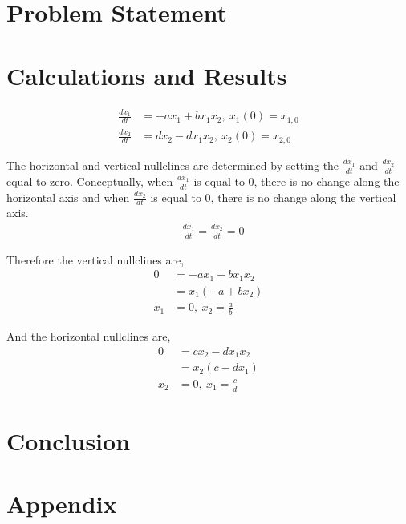 \documentclass[12pt]{article}   %
\theoremstyle{definition}
\numberwithin{equation}{section}
\begin{document}
\section{Problem Statement} \label{APPM2360proj01sec01}




\newpage
\setcounter{page}{5}
\section{Calculations and Results} \label{APPM2360proj01sec01}

\begin{align*}
%
\frac{dx_1}{dt} & = -ax_1 + bx_1x_2 ,\ x_1(0) = x_{1,0}\\
%
\frac{dx_2}{dt} & = dx_2 - dx_1x_2 ,\ x_2(0) = x_{2,0}
%
\end{align*}

The horizontal and vertical nullclines are determined by setting the $\frac{dx_1}{dt}$ and $\frac{dx_2}{dt}$ equal to zero. Conceptually, when $\frac{dx_1}{dt}$ is equal to 0, there is no change along the horizontal axis and when $\frac{dx_2}{dt}$ is equal to 0, there is no change along the vertical axis. 
\begin{align*}
& \frac{dx_1}{dt} = \frac{dx_2}{dt} = 0
\end{align*}

Therefore the vertical nullclines are,
\begin{align*}
%
0 & =  -ax_1 + bx_1x_2 \\
%  
 & = x_1(-a + bx_2) \\
%
x_1 &= 0, \ x_2 = \frac{a}{b}  
%
\end{align*}

And the horizontal nullclines are, 
\begin{align*}
%
0 & = cx_2 - dx_1x_2 \\  
%
& =  x_2(c - dx_1) \\
%
x_2 &= 0, \ x_1 = \frac{c}{d} 
\end{align*}






\newpage
\setcounter{page}{6}
\section{Conclusion} \label{APPM2360proj01sec01}




\newpage
\setcounter{page}{7}
\section{Appendix} \label{APPM2360proj01sec01}
\end{document}
